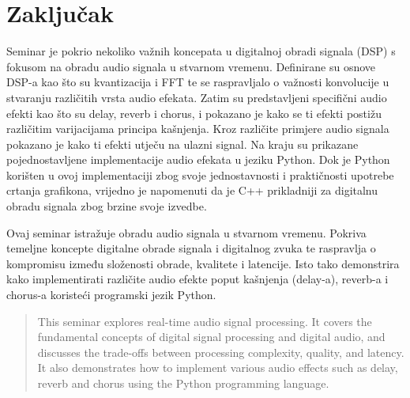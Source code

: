 \documentclass[times, utf8, seminar, numeric]{fer}
\begin{document}
\chapter{Zaključak}
Seminar je pokrio nekoliko važnih koncepata u digitalnoj obradi signala (DSP) s fokusom na obradu audio signala u stvarnom vremenu. Definirane su osnove DSP-a kao što su kvantizacija i FFT te se raspravljalo o važnosti konvolucije u stvaranju različitih vrsta audio efekata. Zatim su predstavljeni specifični audio efekti kao što su delay, reverb i chorus, i pokazano je kako se ti efekti postižu različitim varijacijama principa kašnjenja. Kroz različite primjere audio signala pokazano je kako ti efekti utječu na ulazni signal. Na kraju su prikazane pojednostavljene implementacije audio efekata u jeziku Python. Dok je Python korišten u ovoj implementaciji zbog svoje jednostavnosti i praktičnosti upotrebe crtanja grafikona, vrijedno je napomenuti da je C++ prikladniji za digitalnu obradu signala zbog brzine svoje izvedbe.




\begin{sazetak}
Ovaj seminar istražuje obradu audio signala u stvarnom vremenu. Pokriva temeljne koncepte digitalne obrade signala i digitalnog zvuka te raspravlja o kompromisu između složenosti obrade, kvalitete i latencije. Isto tako demonstrira kako implementirati različite audio efekte poput kašnjenja (delay-a), reverb-a i chorus-a koristeći programski jezik Python. 
\newline
{}
\end{sazetak}

\begin{abstract}
This seminar explores real-time audio signal processing. It covers the fundamental concepts of digital signal processing and digital audio, and discusses the trade-offs between processing complexity, quality, and latency. It also demonstrates how to implement various audio effects such as delay, reverb and chorus using the Python programming language.
\newline
{}
\end{abstract}
\end{document}
